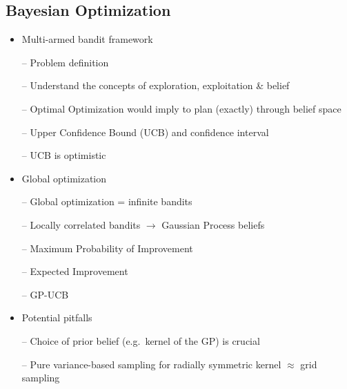 
\subsection{Bayesian Optimization}

\begin{itemize}

\item Multi-armed bandit framework

-- Problem definition

-- Understand the concepts of exploration, exploitation \& belief

-- Optimal Optimization would imply to plan (exactly) through belief
space

-- Upper Confidence Bound (UCB) and confidence interval

-- UCB is optimistic

\item Global optimization

-- Global optimization = infinite bandits

-- Locally correlated bandits $\to$ Gaussian Process beliefs

-- Maximum Probability of Improvement

-- Expected Improvement

-- GP-UCB

\item Potential pitfalls

-- Choice of prior belief (e.g.\ kernel of the GP) is crucial

-- Pure variance-based sampling for radially symmetric kernel
$\approx$ grid sampling

\end{itemize}


\clearpage
{}
\printindex



